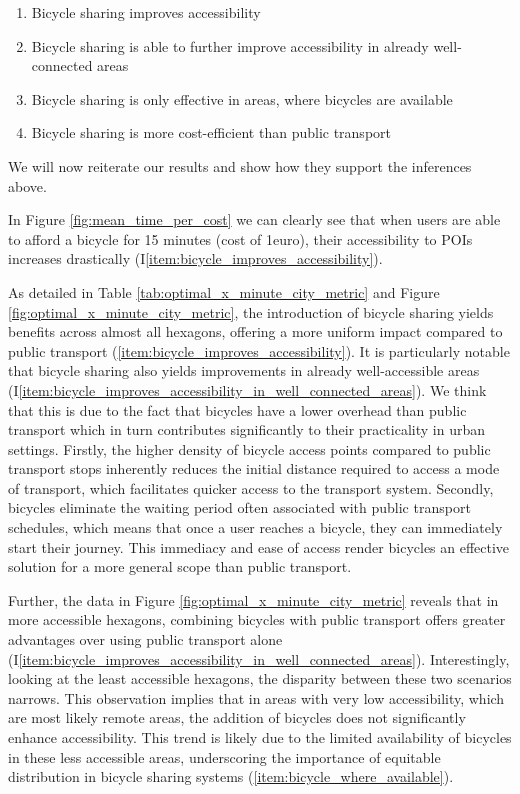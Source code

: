 \begin{enumerate}
  \renewcommand{\labelenumi}{I\theenumi.}
  \item Bicycle sharing improves accessibility \label{item:bicycle_improves_accessibility}
  \item Bicycle sharing is able to further improve accessibility in already well-connected areas \label{item:bicycle_improves_accessibility_in_well_connected_areas}
  \item Bicycle sharing is only effective in areas, where bicycles are available \label{item:bicycle_where_available}
  \item Bicycle sharing is more cost-efficient than public transport \label{item:bicycle_more_cost_efficient_than_pt}
\end{enumerate}

We will now reiterate our results and show how they support the inferences above.

In Figure \ref{fig:mean_time_per_cost} we can clearly see that when users are able to afford a bicycle for 15 minutes (cost of 1euro), their accessibility to POIs increases drastically (I\ref{item:bicycle_improves_accessibility}).

As detailed in Table \ref{tab:optimal_x_minute_city_metric} and Figure \ref{fig:optimal_x_minute_city_metric}, the introduction of bicycle sharing yields benefits across almost all hexagons, offering a more uniform impact compared to public transport (\ref{item:bicycle_improves_accessibility}).
It is particularly notable that bicycle sharing also yields improvements in already well-accessible areas (I\ref{item:bicycle_improves_accessibility_in_well_connected_areas}).
We think that this is due to the fact that bicycles have a lower overhead than public transport which in turn contributes significantly to their practicality in urban settings.
Firstly, the higher density of bicycle access points compared to public transport stops inherently reduces the initial distance required to access a mode of transport, which  facilitates quicker access to the transport system. 
Secondly, bicycles eliminate the waiting period often associated with public transport schedules, which means that once a user reaches a bicycle, they can immediately start their journey. 
This immediacy and ease of access render bicycles an effective solution for a more general scope than public transport.

Further, the data in Figure \ref{fig:optimal_x_minute_city_metric} reveals that in more accessible hexagons, combining bicycles with public transport offers greater advantages over using public transport alone (I\ref{item:bicycle_improves_accessibility_in_well_connected_areas}).
Interestingly, looking at the least accessible hexagons, the disparity between these two scenarios narrows. 
This observation implies that in areas with very low accessibility, which are most likely remote areas, the addition of bicycles does not significantly enhance accessibility.
This trend is likely due to the limited availability of bicycles in these less accessible areas, underscoring the importance of equitable distribution in bicycle sharing systems (\ref{item:bicycle_where_available}).

